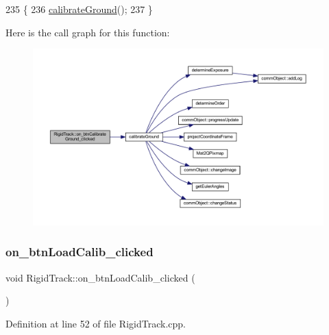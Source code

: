 \begin{DoxyCode}
235 \{
236     \hyperlink{main_8cpp_a7ad2e3cfb5056dbab2098e0dd3bd353f}{calibrateGround}();
237 \}
\end{DoxyCode}
Here is the call graph for this function\+:
\nopagebreak
\begin{figure}[H]
\begin{center}
\leavevmode
\includegraphics[width=350pt]{class_rigid_track_a9a939d6db3d268e75a603cb3d492a91b_cgraph}
\end{center}
\end{figure}
\mbox{\label{class_rigid_track_a2224d3f6d923a1c7bad356f49d7a4124}} 
\subsubsection{\texorpdfstring{on\+\_\+btn\+Load\+Calib\+\_\+clicked}{on\_btnLoadCalib\_clicked}}
{\footnotesize\ttfamily void Rigid\+Track\+::on\+\_\+btn\+Load\+Calib\+\_\+clicked (\begin{DoxyParamCaption}{ }\end{DoxyParamCaption})\hspace{0.3cm}{\ttfamily [slot]}}



Definition at line 52 of file Rigid\+Track.\+cpp.


